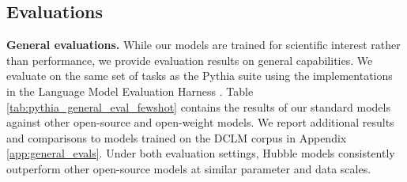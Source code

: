 \documentclass{article} %
\begin{document}
% 

\subsection{Evaluations} \label{sec:evaluations}


\textbf{General evaluations.} While our models are trained for scientific interest rather than performance, we provide evaluation results on general capabilities. We evaluate on the same set of tasks as the Pythia suite using the implementations in the Language Model Evaluation Harness \cite[lm-eval-harness;][]{eval-harness}. Table \ref{tab:pythia_general_eval_fewshot} contains the results of our standard models against other open-source and open-weight models. We report additional results and comparisons to models trained on the \textsc{DCLM} corpus in Appendix \ref{app:general_evals}. Under both evaluation settings, Hubble models consistently outperform other open-source models at similar parameter and data scales.
\end{document}
